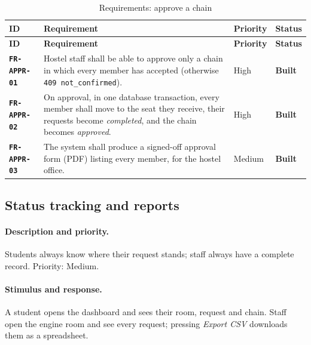\documentclass[11pt,a4paper,parskip=half,toc=listof]{scrreprt}
\newcommand{\Built}{\textcolor{builtgreen}{\textbf{Built}}}
\newcommand{\Req}[1]{\textbf{\texttt{#1}}}
\newcommand{\ReqHeader}{%
  \toprule
  \textbf{ID} & \textbf{Requirement} & \textbf{Priority} & \textbf{Status}\\
  \midrule}
\begin{document}
\begin{xltabular}{\linewidth}{@{}L{2.25cm}YL{1.55cm}L{1.6cm}@{}}
  \caption{Requirements: approve a chain}\label{tab:fr-appr}\\
  \ReqHeader
  \endfirsthead
  \ReqHeader
  \endhead
  \bottomrule
  \endlastfoot
  \Req{FR-APPR-01} & Hostel staff shall be able to approve only a chain in
    which every member has accepted (otherwise \texttt{409
    not\_confirmed}). & High & \Built\\
  \Req{FR-APPR-02} & On approval, in one database transaction, every member
    shall move to the seat they receive, their requests become
    \emph{completed}, and the chain becomes \emph{approved}. & High &
    \Built\\
  \Req{FR-APPR-03} & The system shall produce a signed-off approval form
    (PDF) listing every member, for the hostel office. & Medium &
    \Built\\
\end{xltabular}

\subsection{Status tracking and reports}

\paragraph{Description and priority.} Students always know where their
request stands; staff always have a complete record. Priority: Medium.

\paragraph{Stimulus and response.} A student opens the dashboard and sees
their room, request and chain. Staff open the engine room and see every
request; pressing \emph{Export CSV} downloads them as a spreadsheet.
\end{document}
